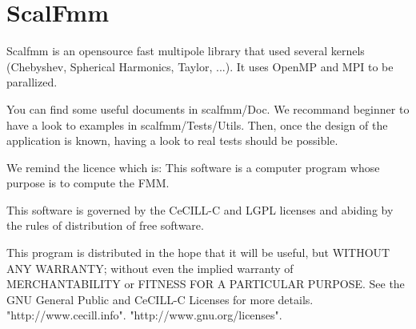 \chapter{Scal\+Fmm}
\hypertarget{index}{}\label{index}
Scalfmm is an opensource fast multipole library that used several kernels (Chebyshev, Spherical Harmonics, Taylor, ...). It uses Open\+MP and MPI to be parallized.

You can find some useful documents in scalfmm/\+Doc. We recommand beginner to have a look to examples in scalfmm/\+Tests/\+Utils. Then, once the design of the application is known, having a look to real tests should be possible.

We remind the licence which is\+: This software is a computer program whose purpose is to compute the FMM.

This software is governed by the Ce\+CILL-\/C and LGPL licenses and abiding by the rules of distribution of free software.

This program is distributed in the hope that it will be useful, but WITHOUT ANY WARRANTY; without even the implied warranty of MERCHANTABILITY or FITNESS FOR A PARTICULAR PURPOSE. See the GNU General Public and Ce\+CILL-\/C Licenses for more details. "{}http\+://www.\+cecill.\+info"{}. "{}http\+://www.\+gnu.\+org/licenses"{}. 